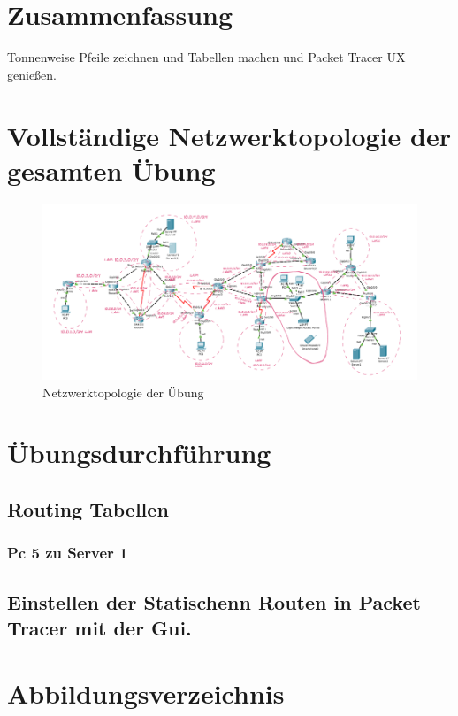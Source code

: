 \documentclass[a4paper]{article}
\begin{document}
\section{Zusammenfassung}
Tonnenweise Pfeile zeichnen und Tabellen machen und Packet Tracer UX genießen.
\newpage

\section{Vollständige Netzwerktopologie der gesamten Übung}

\begin{figure}[h]
	\includegraphics[scale=0.5]{topologie.png}
	\caption{Netzwerktopologie der Übung}
\end{figure}

\newpage

\section{Übungsdurchführung}

\subsection{Routing Tabellen}
\subsubsection{Pc 5 zu Server 1}



\subsection{Einstellen der Statischenn Routen in Packet Tracer mit der Gui.}

\newpage

\section{Abbildungsverzeichnis}

\listoffigures
\end{document}
